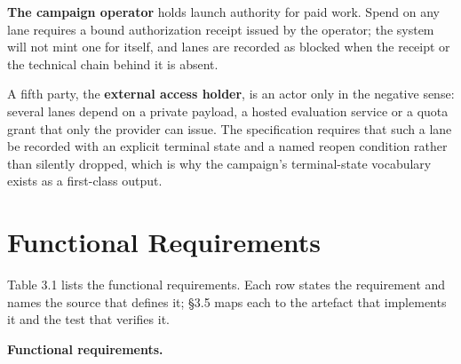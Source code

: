 \documentclass[12pt,a4paper]{report}
\begin{document}
\textbf{The campaign operator} holds launch authority for paid work.
Spend on any lane requires a bound authorization receipt issued by the
operator; the system will not mint one for itself, and lanes are
recorded as blocked when the receipt or the technical chain behind it is
absent.

A fifth party, the \textbf{external access holder}, is an actor only in
the negative sense: several lanes depend on a private payload, a hosted
evaluation service or a quota grant that only the provider can issue.
The specification requires that such a lane be recorded with an explicit
terminal state and a named reopen condition rather than silently
dropped, which is why the campaign's terminal-state vocabulary exists as
a first-class output.

\section{Functional Requirements}\label{functional-requirements}

Table 3.1 lists the functional requirements. Each row states the
requirement and names the source that defines it; §3.5 maps each to the
artefact that implements it and the test that verifies it.

\textbf{Functional requirements.}
\end{document}
